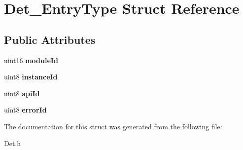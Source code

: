 \hypertarget{structDet__EntryType}{}\section{Det\+\_\+\+Entry\+Type Struct Reference}
\label{structDet__EntryType}
\subsection*{Public Attributes}
\begin{DoxyCompactItemize}
\item 
uint16 {\bfseries module\+Id}\hypertarget{structDet__EntryType_aa8745ff646938234b9687d4a5c14f606}{}\label{structDet__EntryType_aa8745ff646938234b9687d4a5c14f606}

\item 
uint8 {\bfseries instance\+Id}\hypertarget{structDet__EntryType_a8de459ae6eea23846e6ffa1e52b086f8}{}\label{structDet__EntryType_a8de459ae6eea23846e6ffa1e52b086f8}

\item 
uint8 {\bfseries api\+Id}\hypertarget{structDet__EntryType_a301d723e7fd09b49f16a06d686273b25}{}\label{structDet__EntryType_a301d723e7fd09b49f16a06d686273b25}

\item 
uint8 {\bfseries error\+Id}\hypertarget{structDet__EntryType_ad50cbaa17ed23c9c783021981c14d3f7}{}\label{structDet__EntryType_ad50cbaa17ed23c9c783021981c14d3f7}

\end{DoxyCompactItemize}


The documentation for this struct was generated from the following file\+:\begin{DoxyCompactItemize}
\item 
Det.\+h\end{DoxyCompactItemize}
